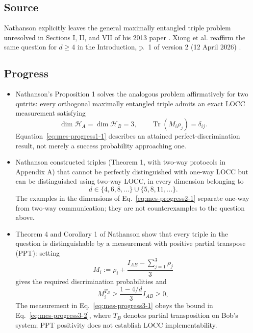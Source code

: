 \subsection*{Source}

Nathanson explicitly leaves the general maximally entangled triple problem unresolved in Sections I, II, and VII of his 2013 paper . Xiong et al. reaffirm the same question for $d\geq4$ in the Introduction, p.~1 of version 2 (12 April 2026) .

\subsection*{Progress}

\begin{itemize}
  \item Nathanson's Proposition 1 solves the analogous problem affirmatively for two qutrits: every orthogonal maximally entangled triple admits an exact LOCC measurement satisfying
  \begin{equation}
\dim\mathcal H_A=\dim\mathcal H_B=3,
  \qquad
  \operatorname{Tr}(M_i\rho_j)=\delta_{ij}.
\label{eq:mes-progress1-1}
\end{equation}
  Equation~\eqref{eq:mes-progress1-1} describes an attained perfect-discrimination result, not merely a success probability approaching one. 

  \item Nathanson constructed triples (Theorem 1, with two-way protocols in Appendix A) that cannot be perfectly distinguished with one-way LOCC but can be distinguished using two-way LOCC, in every dimension belonging to
  \begin{equation}
d\in\{4,6,8,\ldots\}\cup\{5,8,11,\ldots\}.
\label{eq:mes-progress2-1}
\end{equation}
  The examples in the dimensions of Eq.~\eqref{eq:mes-progress2-1} separate one-way from two-way communication; they are not counterexamples to the question above. 

  \item Theorem 4 and Corollary 1 of Nathanson show that every triple in the question is distinguishable by a measurement with positive partial transpose (PPT): setting
  \begin{equation}
M_i:=\rho_i+\frac{I_{AB}-\sum_{j=1}^3\rho_j}{3}
\label{eq:mes-progress3-1}
\end{equation}
  gives the required discrimination probabilities and
  \begin{equation}
M_i^{T_B}\geq\frac{1-4/d}{3}I_{AB}\geq0,
\label{eq:mes-progress3-2}
\end{equation}
  The measurement in Eq.~\eqref{eq:mes-progress3-1} obeys the bound in Eq.~\eqref{eq:mes-progress3-2}, where $T_B$ denotes partial transposition on Bob's system; PPT positivity does not establish LOCC implementability. 


\end{itemize}
